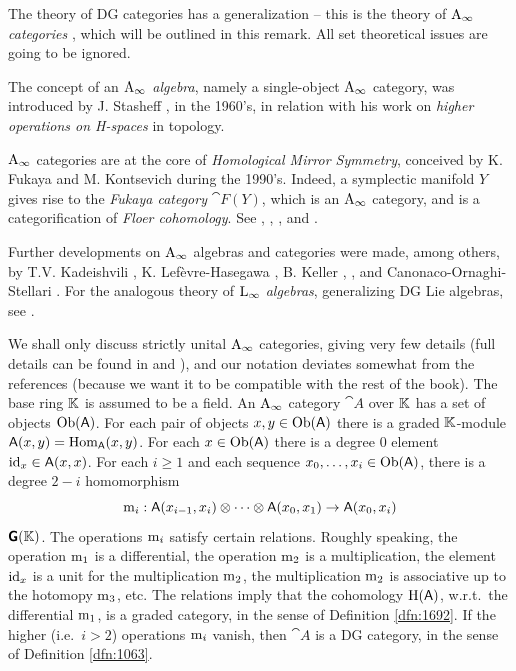 \begin{rem} \label{rem:4960}
The theory of DG categories has a generalization -- this is the theory of {\em 
$\mathrm{A}_{\infty}$ categories}%
,
which will be outlined in this remark.
All set theoretical issues are going to be ignored.

The concept of an {\em $\mathrm{A}_{\infty}$ algebra}, namely a single-object 
$\mathrm{A}_{\infty}$ category, was introduced by J. Stasheff \cite{Sta1}, 
\cite{Sta2} in the 1960's, in relation with his work on {\em higher 
operations on H-spaces} in topology. 

$\mathrm{A}_{\infty}$ categories are at the core of  {\em Homological Mirror 
Symmetry}, conceived by K. Fukaya and M. Kontsevich during the 1990's.
Indeed, a symplectic manifold $Y$ gives rise to the {\em Fukaya category} 
$\cat{F}(Y)$, which is an $\mathrm{A}_{\infty}$ category, and is a categorification 
of {\em Floer cohomology}. See \cite{Fuk}, \cite{Kon}, \cite{KoSo}, \cite{Seid} 
and \cite{HMS}. 

Further developments on $\mathrm{A}_{\infty}$ algebras and categories were made, 
among others, by T.V. Kadeishvili \cite{Kad}, K. Lef\`evre-Hasegawa \cite{Lef}, 
B. Keller \cite{Kel6}, \cite{Kel5}, and Canonaco-Ornaghi-Stellari \cite{COS}. 
For the analogous theory of {\em $\mathrm{L}_{\infty}$ algebras},
generalizing DG Lie algebras, see \cite{Ye5.5}.

We shall only discuss strictly unital $\mathrm{A}_{\infty}$ categories, giving 
very few details (full details can be found in \cite{Kel5} and \cite{COS}), and 
our notation deviates somewhat from the references
(because we want it to be compatible with the rest of the book). 
The base ring $\mathbb{K}$ is assumed to be a field. 
An $\mathrm{A}_{\infty}$ category $\cat{A}$ over $\mathbb{K}$
has a set of objects $\operatorname{Ob}(\operatorname{\mathsf{A}})$. For each pair of objects $x, y \in 
\operatorname{Ob}(\operatorname{\mathsf{A}})$ there is a graded $\mathbb{K}$-module 
$\operatorname{\mathsf{A}}(x, y) = \operatorname{Hom}_{\operatorname{\mathsf{A}}}(x, y)$. 
For each $x \in \operatorname{Ob}(\operatorname{\mathsf{A}})$ there is a degree 
$0$ element $\operatorname{id}_x \in \operatorname{\mathsf{A}}(x, x)$.
For each $i \geq 1$ and each sequence 
$x_0, \ldots, x_i \in \operatorname{Ob}(\operatorname{\mathsf{A}})$, there is a 
degree $2 - i$ homomorphism 
\begin{equation} \label{4960}
\operatorname{m}_i : \operatorname{\mathsf{A}}(x_{i - 1}, x_{i}) \otimes \cdots \otimes  
\operatorname{\mathsf{A}}(x_{0}, x_{1}) \to \operatorname{\mathsf{A}}(x_{0}, x_{i}) 
\end{equation}
$\boldsymbol{\mathsf{G}}(\mathbb{K})$. 
The operations $\operatorname{m}_i$ satisfy certain relations. 
Roughly speaking, the operation $\operatorname{m}_1$ is a differential, the operation 
$\operatorname{m}_2$ is a multiplication, the element $\operatorname{id}_x$ is a unit for the 
multiplication $\operatorname{m}_2$, the multiplication $\operatorname{m}_2$ is associative 
up to the hotomopy $\operatorname{m}_3$, etc.
The relations imply that the cohomology $\operatorname{H}(\operatorname{\mathsf{A}})$, w.r.t.\ the 
differential $\operatorname{m}_1$, is a graded category, in the sense of 
Definition \ref{dfn:1692}.
If the higher (i.e.\ $i > 2$) operations $\operatorname{m}_i$ vanish, then $\cat{A}$ 
is a DG category, in the sense 
of Definition \ref{dfn:1063}.


\end{rem}
